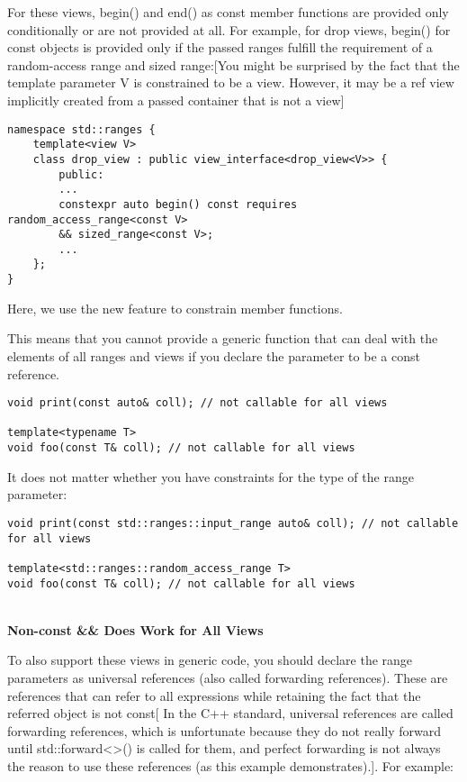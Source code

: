 For these views, begin() and end() as const member functions are provided only conditionally or are not provided at all. For example, for drop views, begin() for const objects is provided only if the passed ranges fulfill the requirement of a random-access range and sized range:[You might be surprised by the fact that the template parameter V is constrained to be a view. However, it may be a ref view implicitly created from a passed container that is not a view]


\begin{lstlisting}[style=styleCXX]
namespace std::ranges {
	template<view V>
	class drop_view : public view_interface<drop_view<V>> {
		public:
		...
		constexpr auto begin() const requires random_access_range<const V>
		&& sized_range<const V>;
		...
	};
}
\end{lstlisting}

Here, we use the new feature to constrain member functions.

This means that you cannot provide a generic function that can deal with the elements of all ranges and views if you declare the parameter to be a const reference.

\begin{lstlisting}[style=styleCXX]
void print(const auto& coll); // not callable for all views

template<typename T>
void foo(const T& coll); // not callable for all views
\end{lstlisting}

It does not matter whether you have constraints for the type of the range parameter:

\begin{lstlisting}[style=styleCXX]
void print(const std::ranges::input_range auto& coll); // not callable for all views

template<std::ranges::random_access_range T>
void foo(const T& coll); // not callable for all views
\end{lstlisting}


\noindent
\hspace*{\fill} \\ %
\textbf{Non-const \&\& Does Work for All Views}

To also support these views in generic code, you should declare the range parameters as universal references (also called forwarding references). These are references that can refer to all expressions while retaining the fact that the referred object is not const[ In the C++ standard, universal references are called forwarding references, which is unfortunate because they do not really forward until std::forward<>() is called for them, and perfect forwarding is not always the reason to use these references (as this example demonstrates).]. For example:

